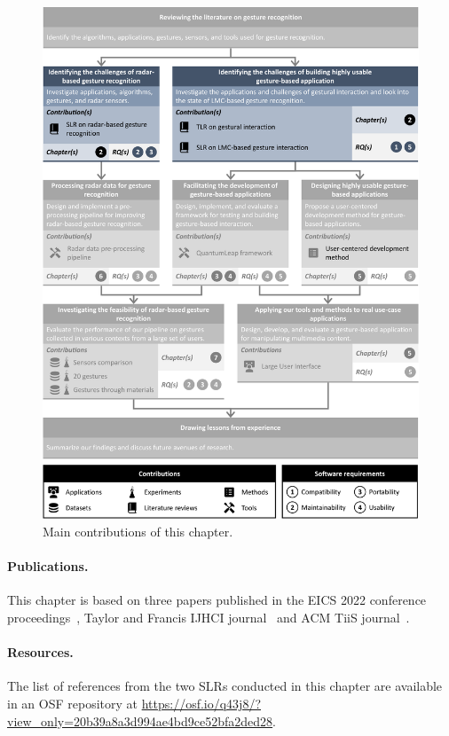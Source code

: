 \begin{figure}
    \centering
    \includegraphics[width=\linewidth]{Figures/StateOfTheArt/graphical-summary-state-of-the-art.pdf}
    \vspace{-18pt}
    \caption{Main contributions of this chapter.}
    \label{fig:state_of_the_art:graphical-summary}
\end{figure}

\paragraph{Publications.} This chapter is based on three papers published in the EICS 2022 conference proceedings~\cite{Sluyters:2022:EICS}, Taylor and Francis IJHCI journal~\cite{Sluyters:2022:LUI} and ACM TiiS journal~\cite{Sluyters:2023}.

\paragraph{Resources.} The list of references from the two SLRs conducted in this chapter are available in an OSF repository at \url{https://osf.io/q43j8/?view_only=20b39a8a3d994ae4bd9ce52bfa2ded28}.



